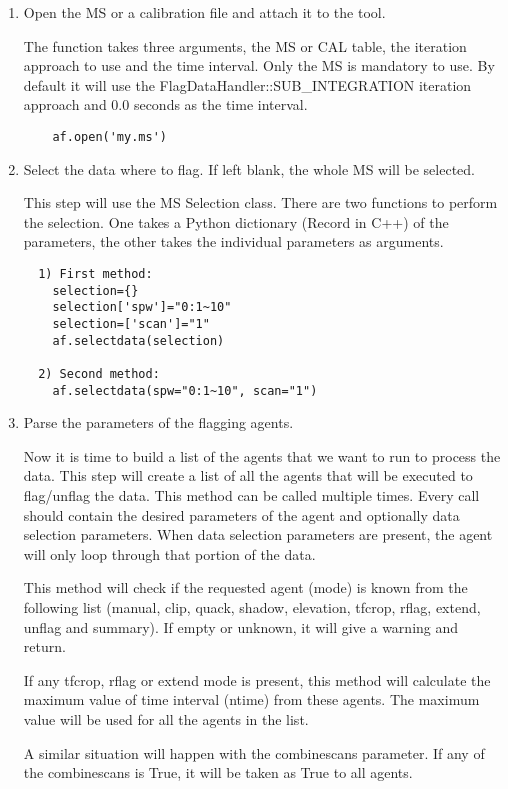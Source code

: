 \begin{enumerate}
\item Open the MS or a calibration file and attach it to the tool.

The function
takes three arguments, the MS or CAL table, the iteration approach to use and the time interval. 
Only the MS is mandatory to use. By default it will use the
FlagDataHandler::SUB\_INTEGRATION iteration approach and 0.0 seconds as the
time interval.

\begin{verbatim}
    af.open('my.ms')
\end{verbatim}

\item Select the data where to flag. If left blank, the whole MS will be
selected.

This step will use the MS Selection class. There are two functions to perform the
selection. One takes a Python dictionary (Record in C++) of the parameters, the
other takes the individual parameters as arguments.

\begin{verbatim}
  1) First method:
    selection={}
    selection['spw']="0:1~10"
    selection=['scan']="1"
    af.selectdata(selection)

  2) Second method:
    af.selectdata(spw="0:1~10", scan="1")
\end{verbatim}

\item Parse the parameters of the flagging agents.

Now it is time to build a list of the agents that we want to run to process the data. This
step will create a list of all the agents that will be executed to flag/unflag the data.
This method can be called multiple times. Every call should contain the desired parameters of
the agent and optionally data selection parameters. When data selection parameters are present,
the agent will only loop through that portion of the data.

This method will check if the requested agent (mode) is known from the following list
(manual, clip, quack, shadow, elevation, tfcrop, rflag, extend, unflag and summary). If
empty or unknown, it will give a warning and return.

If any tfcrop, rflag or extend mode is present, this method will calculate the maximum value
of time interval (ntime) from these agents. The maximum value will be used for
all the agents in the list.

A similar situation will happen with the combinescans parameter. If any of the combinescans is
True, it will be taken as True to all agents.


\end{enumerate}
